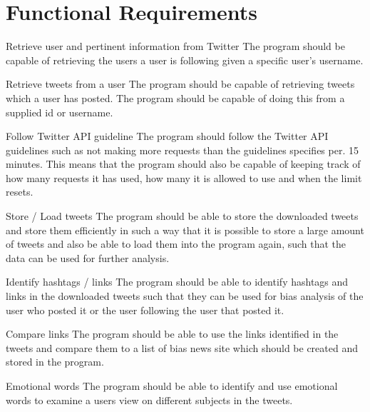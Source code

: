 \section{Functional Requirements}

\begin{requirement}{Retrieve user and pertinent information from Twitter}
The program should be capable of retrieving the users a user is
following given a specific user's username.
\end{requirement}

\begin{requirement}{Retrieve tweets from a user}
The program should be capable of retrieving tweets which a user has posted. The
program should be capable of doing this from a supplied id or username.
\end{requirement}

\begin{requirement}{Follow Twitter \ac{API} guideline}
The program should follow the Twitter \ac{API} guidelines such as not making
more requests than the guidelines specifies per. 15 minutes. This means that the
program should also be capable of keeping track of how many requests it has
used, how many it is allowed to use and when the limit resets.
\end{requirement}

\begin{requirement}{Store / Load tweets}
The program should be able to store the downloaded tweets and store them
efficiently in such a way that it is possible to store a large amount of tweets
and also be able to load them into the program again, such that the data can be
used for further analysis.
\end{requirement}

\begin{requirement}{Identify hashtags / links}
The program should be able to identify hashtags and links in the downloaded
tweets such that they can be used for bias analysis of the user who posted it or
the user following the user that posted it.
\end{requirement}

\begin{requirement}{Compare links}
The program should be able to use the links identified in the tweets and compare
them to a list of bias news site which should be created and stored in the
program. 
\end{requirement}

\begin{requirement}{Emotional  words}
The program should be able to identify and use emotional words to examine a
users view on different subjects in the tweets. 
\end{requirement}

